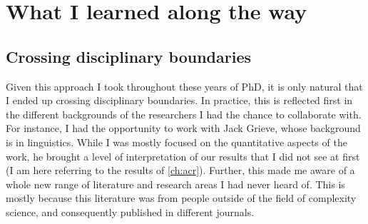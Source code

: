 \documentclass[../thesis.tex]{subfiles}
\begin{document}
\section{What I learned along the way}



\subsection{Crossing disciplinary boundaries}
Given this approach I took throughout these years of PhD, it is only natural that I
ended up crossing disciplinary boundaries. In practice, this is reflected first in the
different backgrounds of the researchers I had the chance to collaborate with. For
instance, I had the opportunity to work with Jack Grieve, whose background is in
linguistics. While I was mostly focused on the quantitative aspects of the work, he
brought a level of interpretation of our results that I did not see at first (I am here
referring to the results of \cref{ch:acr}). Further, this made me aware of a whole new
range of literature and research areas I had never heard of. This is mostly because this
literature was from people outside of the field of complexity science, and consequently
published in different journals.
\end{document}
